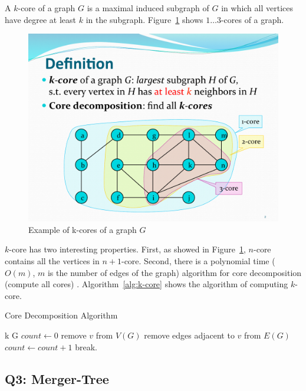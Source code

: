 A $k$-core of a graph $G$ is a maximal induced subgraph of $G$ in which all
vertices have degree at least $k$ in the subgraph. 
Figure~\ref{fig:k-core_example} shows $1 \ldots 3$-cores of a graph. 

\begin{figure}[t]
    \centering
    \includegraphics[width=0.9\linewidth]{images/kcore.pdf}
    \caption{Example of k-cores of a graph $G$}
    \label{fig:k-core_example}
\end{figure}

$k$-core has two interesting properties. First, as showed in 
Figure~\ref{fig:k-core_example}, $n$-core contains all the vertices 
in $n+1$-core. Second, there is a polynomial time ($O(m)$, $m$ is the 
number of edges of the graph) algorithm for 
core decomposition (compute all cores) \cite{BatageljM03CORR}.
Algorithm~\ref{alg:k-core} shows the algorithm of computing $k$-core.

\begin{algorithm}
\caption{Core Decomposition Algorithm}
\label{alg:k-core}
\begin{algorithmic}[1]
\Require k 
\Require G 
    \State $count \leftarrow 0$
            \State remove $v$ from $V(G)$
            \State remove edges adjacent to $v$ from $E(G)$
            \State $count \leftarrow count+1$
        \EndIf
    \EndFor
        \State break.
    \EndIf
\EndWhile
\end{algorithmic}
\end{algorithm}

\subsection{Q3: Merger-Tree}

